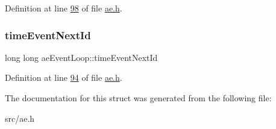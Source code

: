 Definition at line \hyperlink{ae_8h_source_l00098}{98} of file \hyperlink{ae_8h_source}{ae.\+h}.

\mbox{\label{structaeEventLoop_a9c389db589e8e0118be0c753c0eed909}} 
\subsubsection{\texorpdfstring{time\+Event\+Next\+Id}{timeEventNextId}}
{\footnotesize\ttfamily long long ae\+Event\+Loop\+::time\+Event\+Next\+Id}



Definition at line \hyperlink{ae_8h_source_l00094}{94} of file \hyperlink{ae_8h_source}{ae.\+h}.



The documentation for this struct was generated from the following file\+:\begin{DoxyCompactItemize}
\item 
src/ae.\+h\end{DoxyCompactItemize}
